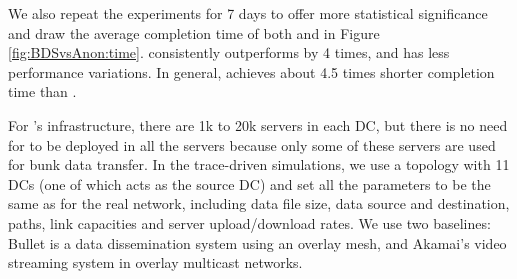 We also repeat the experiments for 7 days to offer more statistical significance and draw the average completion time of both \name and \company in Figure \ref{fig:BDSvsAnon:time}. \name consistently outperforms \company by 4 times, and has less performance variations.
In general, \name achieves about 4.5 times shorter completion time than \company.



For \company's infrastructure, there are 1k to 20k servers in each DC, but there is no need for \name to be deployed in all the servers because only some of these servers are used for bunk data transfer. In the trace-driven simulations, we use a topology with 11 DCs (one of which acts as the source DC) and set all the parameters to be the same as for the real network, including data file size, data source and destination, paths, link capacities and server upload/download rates. We use two baselines: Bullet \cite{kostic2003bullet} is a data dissemination system using an overlay mesh, and Akamai's video streaming system \cite{Andreev2013Designing} in overlay multicast networks.

